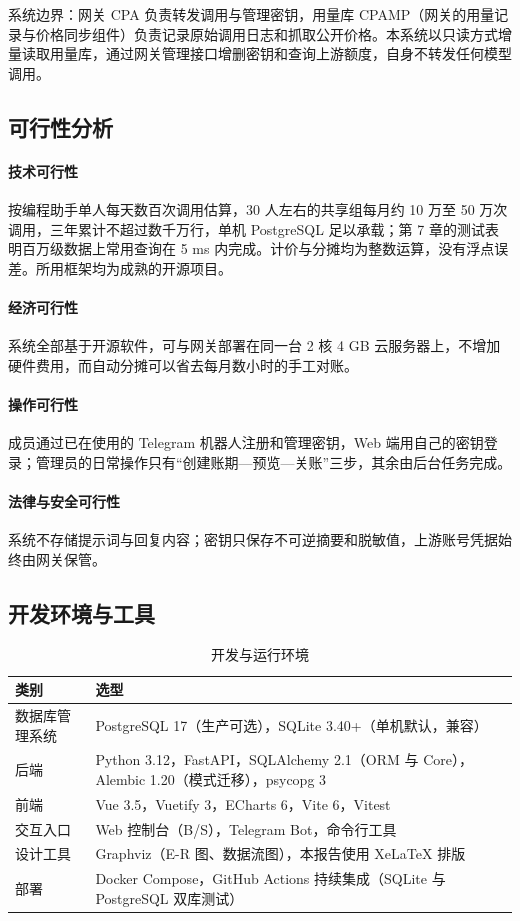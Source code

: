 系统边界：网关 CPA 负责转发调用与管理密钥，用量库 CPAMP（网关的用量记录与价格同步组件）负责记录原始调用日志和抓取公开价格。本系统以只读方式增量读取用量库，通过网关管理接口增删密钥和查询上游额度，自身不转发任何模型调用。

\subsection{可行性分析}

\paragraph{技术可行性}
按编程助手单人每天数百次调用估算，30 人左右的共享组每月约 10 万至 50 万次调用，三年累计不超过数千万行，单机 PostgreSQL 足以承载；第 7 章的测试表明百万级数据上常用查询在 5 ms 内完成。计价与分摊均为整数运算，没有浮点误差。所用框架均为成熟的开源项目。

\paragraph{经济可行性}
系统全部基于开源软件，可与网关部署在同一台 2 核 4 GB 云服务器上，不增加硬件费用，而自动分摊可以省去每月数小时的手工对账。

\paragraph{操作可行性}
成员通过已在使用的 Telegram 机器人注册和管理密钥，Web 端用自己的密钥登录；管理员的日常操作只有“创建账期—预览—关账”三步，其余由后台任务完成。

\paragraph{法律与安全可行性}
系统不存储提示词与回复内容；密钥只保存不可逆摘要和脱敏值，上游账号凭据始终由网关保管。

\subsection{开发环境与工具}

\begin{table}[H]
\centering\small
\caption{开发与运行环境}
\begin{tabularx}{\textwidth}{@{}lX@{}}
\toprule
类别 & 选型 \\ \midrule
数据库管理系统 & PostgreSQL 17（生产可选），SQLite 3.40+（单机默认，兼容） \\
后端 & Python 3.12，FastAPI，SQLAlchemy 2.1（ORM 与 Core），Alembic 1.20（模式迁移），psycopg 3 \\
前端 & Vue 3.5，Vuetify 3，ECharts 6，Vite 6，Vitest \\
交互入口 & Web 控制台（B/S），Telegram Bot，命令行工具 \\
设计工具 & Graphviz（E-R 图、数据流图），本报告使用 XeLaTeX 排版 \\
部署 & Docker Compose，GitHub Actions 持续集成（SQLite 与 PostgreSQL 双库测试） \\
\bottomrule
\end{tabularx}
\end{table}

